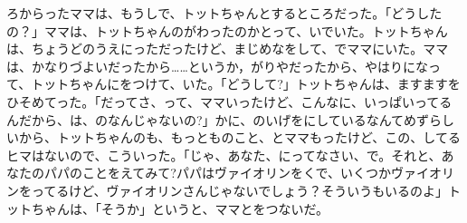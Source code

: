 ろからったママは、もうしで、トットちゃんとするところだった。「どうしたの？」ママは、トットちゃんのがわったのかとって、いでいた。トットちゃんは、ちょうどのうえにっただったけど、まじめなをして、でママにいた。ママは、かなりづよいだったから……というか，がりやだったから、やはりになって、トットちゃんにをつけて、いた。「どうして?」トットちゃんは、ますますをひそめてった。「だってさ、って、ママいったけど、こんなに、いっぱいってるんだから、は、のなんじゃないの?」かに、のいげをにしているなんてめずらしいから、トットちゃんのも、もっとものこと、とママもったけど、この、してるヒマはないので、こういった。「じゃ、あなた、にってなさい、で。それと、あなたのパパのことをえてみて?パパはヴァイオリンをくで、いくつかヴァイオリンをってるけど、ヴァイオリンさんじゃないでしょう？そういうもいるのよ」トットちゃんは、「そうか」というと、ママとをつないだ。


